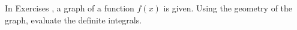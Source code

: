 {\noindent In Exercises}
{, a graph of a function $f(x)$ is given. Using the geometry of the graph, evaluate the definite integrals.}
